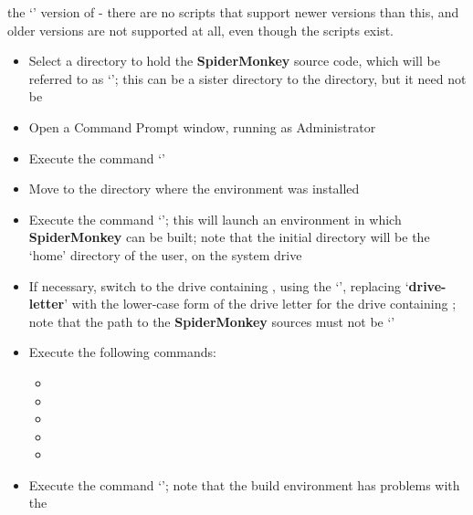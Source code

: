 the `' version of  - there are
no scripts that support newer versions than this, and older versions are not supported at
all, even though the scripts exist.
\begin{itemize}
\item Select a directory to hold the \textbf{SpiderMonkey} source code, which will be
referred to as `'; this can be a sister directory to the
 directory, but it need not be
\item\exSp{}Open a Command Prompt window, running as Administrator
\item\exSp{}Execute the command
`'
\item\exSp{}Move to the directory where the  environment was
installed
\item\exSp{}Execute the command `'; this will launch
an environment in which \textbf{SpiderMonkey} can be built; note that the initial
directory will be the `home' directory of the user, on the system drive
\item\exSp{}If necessary, switch to the drive containing ,
using the `', replacing `\textbf{drive-letter}' with
the lower-case form of the drive letter for the drive containing
; note that the path to the \textbf{SpiderMonkey} sources
must not be `'
\item\exSp{}Execute the following commands:
\begin{itemize}
\item{}
\item\exSp{}
\item\exSp{}
\item\exSp{}
\item\exSp{}
\end{itemize}
\item\exSp{}Execute the command `'; note that the build environment has problems with the

\end{itemize}
